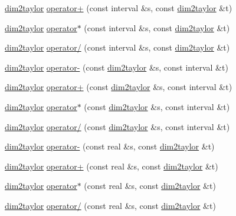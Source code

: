 \begin{DoxyCompactItemize}
\item 
\hyperlink{classtaylor_1_1dim2taylor}{dim2taylor} \hyperlink{namespacetaylor_a2a26f996b068d51e9ee8d146d0dbcf19}{operator+} (const interval \&s, const \hyperlink{classtaylor_1_1dim2taylor}{dim2taylor} \&t)
\item 
\hyperlink{classtaylor_1_1dim2taylor}{dim2taylor} \hyperlink{namespacetaylor_a773f854b7253664683fcdc3c2c31279a}{operator$\ast$} (const interval \&s, const \hyperlink{classtaylor_1_1dim2taylor}{dim2taylor} \&t)
\item 
\hyperlink{classtaylor_1_1dim2taylor}{dim2taylor} \hyperlink{namespacetaylor_ac0269d08341f74bef9f161ce04311b99}{operator/} (const interval \&s, const \hyperlink{classtaylor_1_1dim2taylor}{dim2taylor} \&t)
\item 
\hyperlink{classtaylor_1_1dim2taylor}{dim2taylor} \hyperlink{namespacetaylor_a27893615a38a300f3a98f155f97554ab}{operator-\/} (const \hyperlink{classtaylor_1_1dim2taylor}{dim2taylor} \&s, const interval \&t)
\item 
\hyperlink{classtaylor_1_1dim2taylor}{dim2taylor} \hyperlink{namespacetaylor_a84b7a1ad831a7d8ff885b7d62c12776c}{operator+} (const \hyperlink{classtaylor_1_1dim2taylor}{dim2taylor} \&s, const interval \&t)
\item 
\hyperlink{classtaylor_1_1dim2taylor}{dim2taylor} \hyperlink{namespacetaylor_a4cf47e58467d78b59fb31fe7d4a03ec6}{operator$\ast$} (const \hyperlink{classtaylor_1_1dim2taylor}{dim2taylor} \&s, const interval \&t)
\item 
\hyperlink{classtaylor_1_1dim2taylor}{dim2taylor} \hyperlink{namespacetaylor_a20f576697e1b2eb2a4247ffe570c4f69}{operator/} (const \hyperlink{classtaylor_1_1dim2taylor}{dim2taylor} \&s, const interval \&t)
\item 
\hyperlink{classtaylor_1_1dim2taylor}{dim2taylor} \hyperlink{namespacetaylor_ad8414f5a1f2b7470dbac63025f7b60b7}{operator-\/} (const real \&s, const \hyperlink{classtaylor_1_1dim2taylor}{dim2taylor} \&t)
\item 
\hyperlink{classtaylor_1_1dim2taylor}{dim2taylor} \hyperlink{namespacetaylor_a4cd1e6c0c0f68726e5b5e95dfd562a70}{operator+} (const real \&s, const \hyperlink{classtaylor_1_1dim2taylor}{dim2taylor} \&t)
\item 
\hyperlink{classtaylor_1_1dim2taylor}{dim2taylor} \hyperlink{namespacetaylor_a778ece51c4eb943bcb8fefc1c98c66f4}{operator$\ast$} (const real \&s, const \hyperlink{classtaylor_1_1dim2taylor}{dim2taylor} \&t)
\item 
\hyperlink{classtaylor_1_1dim2taylor}{dim2taylor} \hyperlink{namespacetaylor_a627c5d5998ccdab6c81f898f33b3a0a3}{operator/} (const real \&s, const \hyperlink{classtaylor_1_1dim2taylor}{dim2taylor} \&t)

\end{DoxyCompactItemize}
